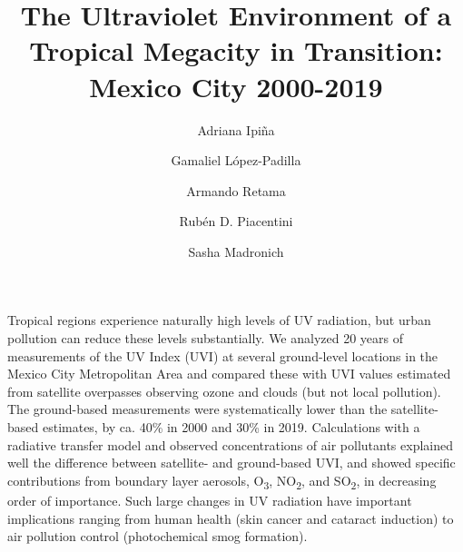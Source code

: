 \documentclass[10pt]{article}
\renewenvironment{abstract}
  {{\bfseries\noindent{\abstractname}\par\nobreak}\footnotesize}
  {\bigskip}
\begin{document}
\title{The Ultraviolet Environment of a Tropical Megacity in Transition: Mexico
  City 2000-2019}


\author[1,2]{Adriana Ipiña}
\author[3]{Gamaliel López-Padilla}
\author[4]{Armando Retama}
\author[1]{Rubén D. Piacentini}
\author[5]{Sasha Madronich}



\vspace{-1em}



\date{}


\begingroup
\let\center\flushleft
\let\endcenter\endflushleft
\maketitle
\endgroup


\linenumbers



\doublespacing


\begin{abstract}
  Tropical regions experience naturally high levels of UV radiation, but
  urban pollution can reduce these levels substantially. We analyzed 20
  years of measurements of the UV Index (UVI) at several ground-level
  locations in the Mexico City Metropolitan Area and compared these with
  UVI values estimated from satellite overpasses observing ozone and
  clouds (but not local pollution). The ground-based measurements were
  systematically lower than the satellite-based estimates, by ca. 40\% in
  2000 and 30\% in 2019. Calculations with a radiative transfer model and
  observed concentrations of air pollutants explained well the difference
  between satellite- and ground-based UVI, and showed specific
  contributions from boundary layer aerosols, O\textsubscript{3},
  NO\textsubscript{2}, and SO\textsubscript{2}, in decreasing order of
  importance. Such large changes in UV radiation have important
  implications ranging from human health (skin cancer and cataract
  induction) to air pollution control (photochemical smog formation).%
\end{abstract}%
\end{document}
